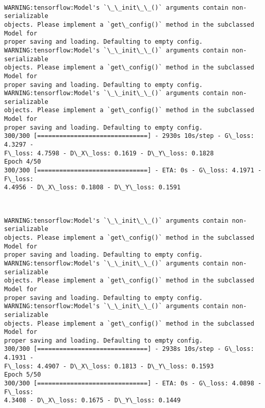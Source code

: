 \documentclass[11pt]{article}
\begin{document}
    \begin{center}
    \end{center}
    { \hspace*{\fill} \\}
    
    \begin{Verbatim}[commandchars=\\\{\}]
WARNING:tensorflow:Model's `\_\_init\_\_()` arguments contain non-serializable
objects. Please implement a `get\_config()` method in the subclassed Model for
proper saving and loading. Defaulting to empty config.
WARNING:tensorflow:Model's `\_\_init\_\_()` arguments contain non-serializable
objects. Please implement a `get\_config()` method in the subclassed Model for
proper saving and loading. Defaulting to empty config.
WARNING:tensorflow:Model's `\_\_init\_\_()` arguments contain non-serializable
objects. Please implement a `get\_config()` method in the subclassed Model for
proper saving and loading. Defaulting to empty config.
300/300 [==============================] - 2930s 10s/step - G\_loss: 4.3297 -
F\_loss: 4.7598 - D\_X\_loss: 0.1619 - D\_Y\_loss: 0.1828
Epoch 4/50
300/300 [==============================] - ETA: 0s - G\_loss: 4.1971 - F\_loss:
4.4956 - D\_X\_loss: 0.1808 - D\_Y\_loss: 0.1591
    \end{Verbatim}

    \begin{center}
    \end{center}
    { \hspace*{\fill} \\}
    
    \begin{Verbatim}[commandchars=\\\{\}]
WARNING:tensorflow:Model's `\_\_init\_\_()` arguments contain non-serializable
objects. Please implement a `get\_config()` method in the subclassed Model for
proper saving and loading. Defaulting to empty config.
WARNING:tensorflow:Model's `\_\_init\_\_()` arguments contain non-serializable
objects. Please implement a `get\_config()` method in the subclassed Model for
proper saving and loading. Defaulting to empty config.
WARNING:tensorflow:Model's `\_\_init\_\_()` arguments contain non-serializable
objects. Please implement a `get\_config()` method in the subclassed Model for
proper saving and loading. Defaulting to empty config.
300/300 [==============================] - 2938s 10s/step - G\_loss: 4.1931 -
F\_loss: 4.4907 - D\_X\_loss: 0.1813 - D\_Y\_loss: 0.1593
Epoch 5/50
300/300 [==============================] - ETA: 0s - G\_loss: 4.0898 - F\_loss:
4.3408 - D\_X\_loss: 0.1675 - D\_Y\_loss: 0.1449
    \end{Verbatim}
\end{document}

